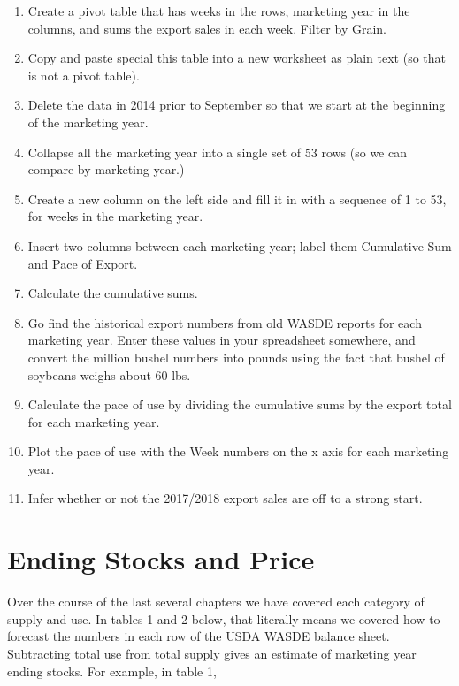 \documentclass[
]{book}
\begin{document}
\begin{enumerate}
\def\labelenumi{\arabic{enumi}.}
\setcounter{enumi}{2}
\item
  Create a pivot table that has weeks in the rows, marketing year in the columns, and sums the export sales in each week. Filter by Grain.
\item
  Copy and paste special this table into a new worksheet as plain text (so that is not a pivot table).
\item
  Delete the data in 2014 prior to September so that we start at the beginning of the marketing year.
\item
  Collapse all the marketing year into a single set of 53 rows (so we can compare by marketing year.)
\item
  Create a new column on the left side and fill it in with a sequence of 1 to 53, for weeks in the marketing year.
\item
  Insert two columns between each marketing year; label them Cumulative Sum and Pace of Export.
\item
  Calculate the cumulative sums.
\item
  Go find the historical export numbers from old WASDE reports for each marketing year. Enter these values in your spreadsheet somewhere, and convert the million bushel numbers into pounds using the fact that bushel of soybeans weighs about 60 lbs.
\item
  Calculate the pace of use by dividing the cumulative sums by the export total for each marketing year.
\item
  Plot the pace of use with the Week numbers on the x axis for each marketing year.
\item
  Infer whether or not the 2017/2018 export sales are off to a strong start.
\end{enumerate}

\hypertarget{ending-stocks-and-price}{%
\chapter{Ending Stocks and Price}\label{ending-stocks-and-price}}

Over the course of the last several chapters we have covered each category of supply and use. In tables 1 and 2 below, that literally means we covered how to forecast the numbers in each row of the USDA WASDE balance sheet. Subtracting total use from total supply gives an estimate of marketing year ending stocks. For example, in table 1,
\end{document}
